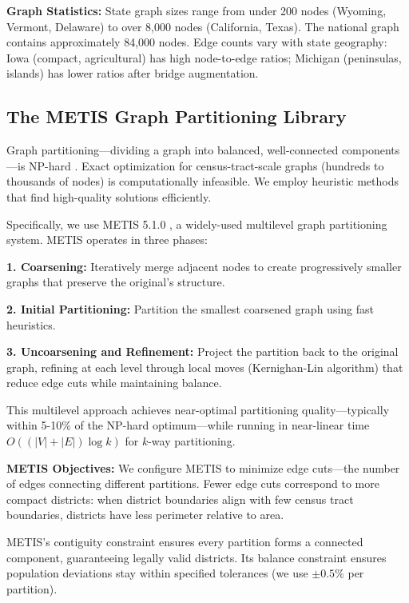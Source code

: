 \textbf{Graph Statistics:} State graph sizes range from under 200 nodes (Wyoming, Vermont, Delaware) to over 8,000 nodes (California, Texas). The national graph contains approximately 84,000 nodes. Edge counts vary with state geography: Iowa (compact, agricultural) has high node-to-edge ratios; Michigan (peninsulas, islands) has lower ratios after bridge augmentation.

\subsection{The METIS Graph Partitioning Library}

Graph partitioning—dividing a graph into balanced, well-connected components—is NP-hard \cite{garey1979computers}. Exact optimization for census-tract-scale graphs (hundreds to thousands of nodes) is computationally infeasible. We employ heuristic methods that find high-quality solutions efficiently.

Specifically, we use METIS 5.1.0 \cite{karypis1998fast}, a widely-used multilevel graph partitioning system. METIS operates in three phases:

\textbf{1. Coarsening:} Iteratively merge adjacent nodes to create progressively smaller graphs that preserve the original's structure.

\textbf{2. Initial Partitioning:} Partition the smallest coarsened graph using fast heuristics.

\textbf{3. Uncoarsening and Refinement:} Project the partition back to the original graph, refining at each level through local moves (Kernighan-Lin algorithm) that reduce edge cuts while maintaining balance.

This multilevel approach achieves near-optimal partitioning quality—typically within 5-10\% of the NP-hard optimum—while running in near-linear time $O((|V| + |E|) \log k)$ for $k$-way partitioning.

\textbf{METIS Objectives:} We configure METIS to minimize edge cuts—the number of edges connecting different partitions. Fewer edge cuts correspond to more compact districts: when district boundaries align with few census tract boundaries, districts have less perimeter relative to area.

METIS's contiguity constraint ensures every partition forms a connected component, guaranteeing legally valid districts. Its balance constraint ensures population deviations stay within specified tolerances (we use $\pm 0.5\%$ per partition).

